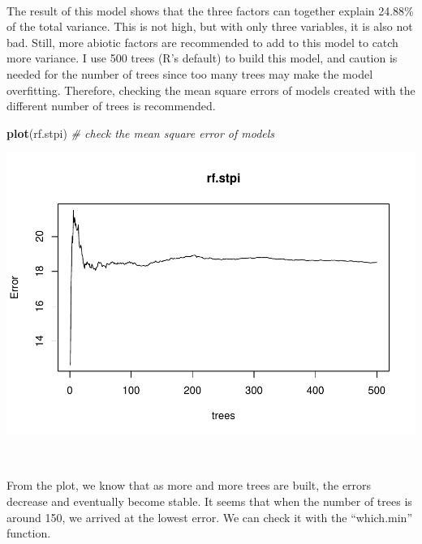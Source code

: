 \documentclass[
]{article}
\newenvironment{Shaded}{\begin{snugshade}}{\end{snugshade}}
\newcommand{\CommentTok}[1]{\textcolor[rgb]{0.56,0.35,0.01}{\textit{#1}}}
\newcommand{\KeywordTok}[1]{\textcolor[rgb]{0.13,0.29,0.53}{\textbf{#1}}}
\newcommand{\NormalTok}[1]{#1}
\newcommand{\OperatorTok}[1]{\textcolor[rgb]{0.81,0.36,0.00}{\textbf{#1}}}
\begin{document}
~

The result of this model shows that the three factors can together
explain 24.88\% of the total variance. This is not high, but with only
three variables, it is also not bad. Still, more abiotic factors are
recommended to add to this model to catch more variance. I use 500 trees
(R's default) to build this model, and caution is needed for the number
of trees since too many trees may make the model overfitting. Therefore,
checking the mean square errors of models created with the different
number of trees is recommended.

\begin{Shaded}
\begin{Highlighting}[]
\KeywordTok{plot}\NormalTok{(rf.stpi) }\CommentTok{# check the mean square error of models}
\end{Highlighting}
\end{Shaded}

\includegraphics{index_files/figure-latex/unnamed-chunk-6-1.pdf}

~

From the plot, we know that as more and more trees are built, the errors
decrease and eventually become stable. It seems that when the number of
trees is around 150, we arrived at the lowest error. We can check it
with the ``which.min'' function.

\begin{Shaded}
\end{Shaded}
\end{document}
